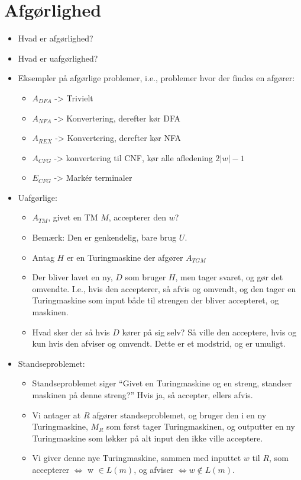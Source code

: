 \newpage

\section*{Afgørlighed}

\begin{itemize}
	\item Hvad er afgørlighed?
	\item Hvad er uafgørlighed?
	\item Eksempler på afgørlige problemer, i.e., problemer hvor der findes en afgører:
	      \begin{itemize}
		      \item $A_{DFA}$ -> Trivielt
		      \item $A_{NFA}$ -> Konvertering, derefter kør DFA
		      \item $A_{REX}$ -> Konvertering, derefter kør NFA
		      \item $A_{CFG}$ -> konvertering til CNF, kør alle afledening $2|w|-1$
		      \item $E_{CFG}$ -> Markér terminaler
	      \end{itemize}
	\item Uafgørlige:
	      \begin{itemize}
		      \item $A_{TM}$, givet en TM $M$, accepterer den $w$?
		      \item Bemærk: Den er genkendelig, bare brug $U$.
		      \item Antag $H$ er en Turingmaskine der afgører $A_{TGM}$
		      \item Der bliver lavet en ny, $D$ som bruger $H$, men tager svaret, og gør det omvendte. I.e., hvis den accepterer, så afvis og omvendt, og den tager en Turingmaskine som input både til strengen der bliver accepteret, og maskinen.
		      \item Hvad sker der så hvis $D$ kører på sig selv? Så ville den acceptere, hvis og kun hvis den afviser og omvendt. Dette er et modstrid, og er umuligt.
	      \end{itemize}
	\item Standseproblemet:
	      \begin{itemize}
		      \item Standseproblemet siger ``Givet en Turingmaskine og en streng, standser maskinen på denne streng?'' Hvis ja, så accepter, ellers afvis.
		      \item Vi antager at $R$ afgører standseproblemet, og bruger den i en ny Turingmaskine, $M_{R}$ som først tager Turingmaskinen, og outputter en ny Turingmaskine som løkker på alt input den ikke ville acceptere.
		      \item Vi giver denne nye Turingmaskine, sammen med inputtet $w$ til $R$, som accepterer $\iff$ w \(\in L(m)\), og afviser $\iff w \notin L(m)$.
	      \end{itemize}
\end{itemize}

